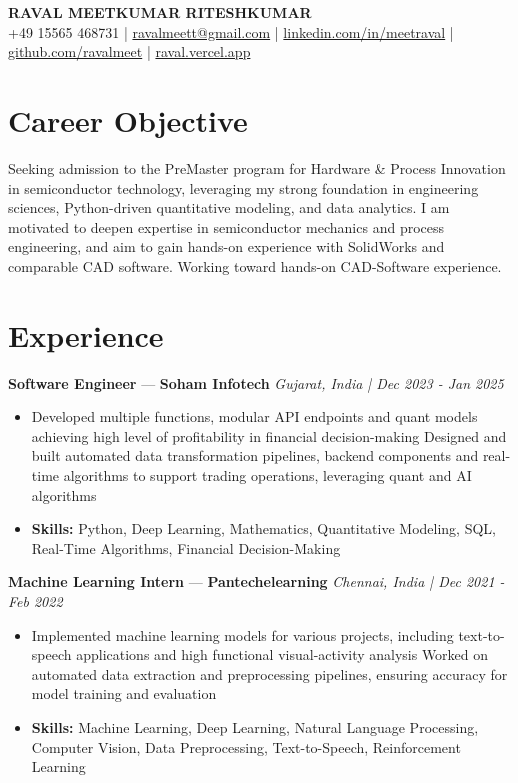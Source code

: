 \documentclass[a4paper,10pt]{article}
\begin{document}
\begin{center}
  {\Large\bfseries RAVAL MEETKUMAR RITESHKUMAR}\\[2pt]
  {\small +49 15565 468731 \;|\; \href{mailto:ravalmeett@gmail.com}{ravalmeett@gmail.com} \;|\; \href{https://www.linkedin.com/in/meetraval/}{linkedin.com/in/meetraval} \;|\; \href{https://github.com/ravalmeet}{github.com/ravalmeet} \;|\; \href{https://raval.vercel.app/}{raval.vercel.app}}
\end{center}
\vspace{-3pt}

\section*{Career Objective}
Seeking admission to the PreMaster program for Hardware \& Process Innovation in semiconductor technology, leveraging my strong foundation in engineering sciences, Python-driven quantitative modeling, and data analytics. I am motivated to deepen expertise in semiconductor mechanics and process engineering, and aim to gain hands-on experience with SolidWorks and comparable CAD software. Working toward hands-on CAD-Software experience.\par

\section*{Experience}
\textbf{Software Engineer} — \textbf{Soham Infotech} \hfill \textit{Gujarat, India \;|\; Dec 2023 - Jan 2025}\par
\vspace{1pt}
\begin{itemize}
  \item Developed multiple functions, modular API endpoints and quant models achieving high level of profitability in financial decision-making Designed and built automated data transformation pipelines, backend components and real-time algorithms to support trading operations, leveraging quant and AI algorithms
  \item \textbf{Skills:} Python, Deep Learning, Mathematics, Quantitative Modeling, SQL, Real-Time Algorithms, Financial Decision-Making
\end{itemize}
\vspace{3pt}
\textbf{Machine Learning Intern} — \textbf{Pantechelearning} \hfill \textit{Chennai, India \;|\; Dec 2021 - Feb 2022}\par
\vspace{1pt}
\begin{itemize}
  \item Implemented machine learning models for various projects, including text-to-speech applications and high functional visual-activity analysis Worked on automated data extraction and preprocessing pipelines, ensuring accuracy for model training and evaluation
  \item \textbf{Skills:} Machine Learning, Deep Learning, Natural Language Processing, Computer Vision, Data Preprocessing, Text-to-Speech, Reinforcement Learning
\end{itemize}
\end{document}
